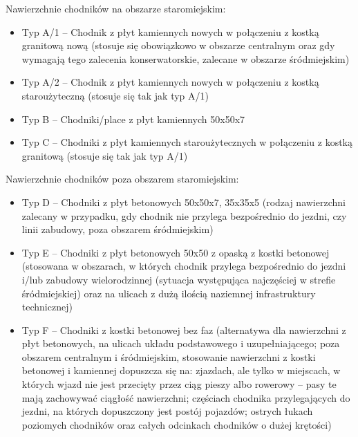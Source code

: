 \documentclass[twoside,12pt]{article}
\begin{document}
\begin{samepage}
Nawierzchnie chodników na obszarze staromiejskim:
	 \begin{itemize}\setlength{\itemsep}{0em}
	 \item Typ A/1 -- Chodnik z płyt kamiennych nowych w połączeniu z kostką granitową nową (stosuje się obowiązkowo w obszarze centralnym oraz gdy wymagają tego zalecenia konserwatorskie, zalecane w obszarze śródmiejskim) \cite{standardy_wroclaw}
	 \item Typ A/2 -- Chodnik z płyt kamiennych nowych w połączeniu z kostką staroużyteczną (stosuje się tak jak typ A/1) \cite{standardy_wroclaw}
	 \item Typ B -- Chodniki/place z płyt kamiennych 50x50x7
	 \item Typ C -- Chodniki z płyt kamiennych staroużytecznych w połączeniu z kostką granitową (stosuje się tak jak typ A/1) \cite{standardy_wroclaw}
	 \end{itemize}\end{samepage}
	 
	 \begin{samepage}
Nawierzchnie chodników poza obszarem staromiejskim:
	 \begin{itemize}\setlength{\itemsep}{0em}
	 \item Typ D -- Chodniki z płyt betonowych 50x50x7, 35x35x5 (rodzaj nawierzchni zalecany w przypadku, gdy chodnik nie przylega bezpośrednio do jezdni, czy linii zabudowy, poza obszarem śródmiejskim) \cite{standardy_wroclaw}
	 \item Typ E -- Chodniki z płyt betonowych 50x50 z opaską z kostki betonowej (stosowana w obszarach, w których chodnik przylega bezpośrednio do jezdni i/lub zabudowy wielorodzinnej (sytuacja występująca najczęściej w strefie śródmiejskiej) oraz na ulicach z dużą ilością naziemnej infrastruktury technicznej) \cite{standardy_wroclaw}
	 \item Typ F -- Chodniki z kostki betonowej bez faz (alternatywa dla nawierzchni z płyt betonowych, na ulicach układu podstawowego i uzupełniającego; poza obszarem centralnym i śródmiejskim, stosowanie nawierzchni z kostki betonowej i kamiennej dopuszcza się na:
zjazdach, ale tylko w miejscach, w których wjazd nie jest przecięty przez ciąg pieszy albo rowerowy -- pasy te mają zachowywać ciągłość nawierzchni; częściach chodnika przylegających do jezdni, na których dopuszczony jest postój pojazdów; ostrych łukach poziomych chodników oraz całych odcinkach chodników o dużej krętości) \cite{standardy_wroclaw}
	 \end{itemize}\end{samepage}
	 
\end{document}
